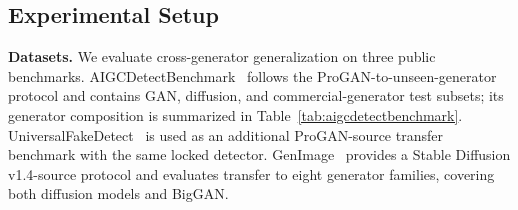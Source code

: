 \documentclass[lettersize,journal]{IEEEtran}
\begin{document}
\subsection{Experimental Setup}
\label{sec:experimental_setup}

\textbf{Datasets.}
We evaluate cross-generator generalization on three public benchmarks. AIGCDetectBenchmark~\cite{zhong2023patchcraft} follows the ProGAN-to-unseen-generator protocol and contains GAN, diffusion, and commercial-generator test subsets; its generator composition is summarized in Table~\ref{tab:aigcdetectbenchmark}. UniversalFakeDetect~\cite{ojha2023univfd} is used as an additional ProGAN-source transfer benchmark with the same locked detector. GenImage~\cite{zhu2023genimage} provides a Stable Diffusion v1.4-source protocol and evaluates transfer to eight generator families, covering both diffusion models and BigGAN.
\end{document}
